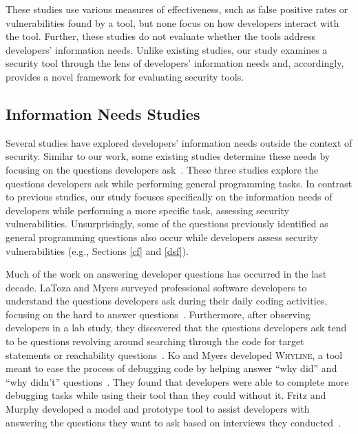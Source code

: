\documentclass[10pt,journal,compsoc]{IEEEtran}
\begin{document}
These studies use various measures of effectiveness, such as false positive rates or vulnerabilities found by a tool, but none focus on how developers interact with the tool. 
Further, these studies do not evaluate whether the tools address developers' information needs. 
Unlike existing studies, our study examines a security tool through the lens of developers' information needs and, accordingly, provides a novel framework for evaluating security tools.

\subsection{Information Needs Studies}
\label{questions}
Several studies have explored developers' information needs outside the context of security.
Similar to our work, some existing studies determine these needs by focusing on the questions developers ask~\cite{latoza2010hard, latoza2010developers, Ko:2007:information, Sillito:2006questions}.
These three studies explore the questions developers ask while performing general programming tasks.
In contrast to previous studies, our study focuses specifically on the information needs of developers while performing a more specific task, assessing security vulnerabilities.
Unsurprisingly, some of the questions previously identified as general programming questions also occur while developers assess security vulnerabilities (e.g., Sections \ref{cf} and \ref{dsf}).

Much of the work on answering developer questions has occurred in the last decade. 
LaToza and Myers surveyed professional software developers to understand the questions developers ask during their daily coding activities, focusing on the hard to answer questions~\cite{latoza2010hard}. 
Furthermore, after observing developers in a lab study, they discovered that the questions developers ask tend to be questions revolving around searching through the code for target statements or reachability questions~\cite{latoza2010developers}. 
Ko and Myers developed \textsc{Whyline}, a tool meant to ease the process of debugging code by helping answer ``why did'' and ``why didn't'' questions~\cite{ko2004designing}. 
They found that developers were able to complete more debugging tasks while using their tool than they could without it.
Fritz and Murphy developed a model and prototype tool to assist developers with answering the questions they want to ask based on interviews they conducted~\cite{fritz2010using}.

\end{document}
